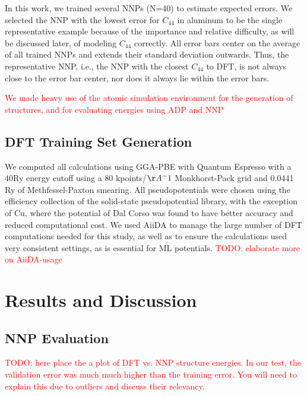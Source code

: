 \documentclass{article}
\begin{document}
In this work, we trained several NNPs (N=40) to estimate expected errors. We selected the NNP with the lowest error for $C_{44}$ in aluminum to be the single representative example because of the importance and relative difficulty, as will be discussed later, of modeling $C_{44}$ correctly. All error bars center on the average of all trained NNPs and extends their standard deviation outwards. Thus, the representative NNP, i.e., the NNP with the closest $C_{44}$ to DFT, is not always close to the error bar center, nor does it always lie within the error bars. 

\textcolor{red}{We made heavy use of the atomic simulation environment for the generation of structures, and for evaluating energies using ADP and NNP \cite{HjorthLarsen2017}}
\subsection{DFT Training Set Generation}
We computed all calculations using GGA-PBE\cite{Perdew1996} with Quantum Espresso\cite{Giannozzi2009} with a 40Ry energy cutoff using a 80 kpoints/$\AA^-1$ Monkhorst-Pack grid\cite{Pack1977SpecialIntegrations} and 0.0441
Ry of Methfessel-Paxton smearing\cite{Methfessel1989High-precisionMetals}.
All pseudopotentials were chosen using the efficiency collection of the solid-state pseudopotential library\cite{Prandini2018}, with the exception of Cu, where the potential of Dal Corso\cite{DalCorso2014}
was found to have better accuracy and reduced computational cost.
We used AiiDA\cite{Pizzi2016} to manage the large number of DFT computations needed for this study, as well as to ensure the calculations used very consistent settings, as is essential for ML potentials\cite{Dragoni2018AchievingIron}.
\textcolor{red}{TODO: elaborate more on AiiDA-usage}

\section{Results and Discussion}
\subsection{NNP Evaluation}
\textcolor{red}{TODO: here place the a plot of DFT vs. NNP structure energies.
In our test, the validation error was much much higher than the training error.
You will need to explain this due to outliers and discuss their relevancy. }
\end{document}

